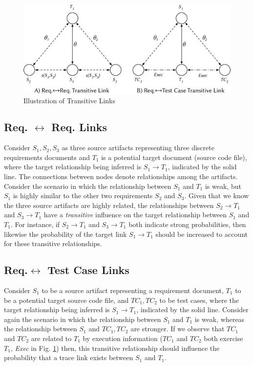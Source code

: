 \begin{figure}%
\centering
\includegraphics[width=\columnwidth]{graphics/applicationsI-approach/fig2_transitive-links.pdf}
\caption{Illustration of Transitive Links}
\label{fig:trans-req2req}
\end{figure}

\subsection{\textbf{Req. $\leftrightarrow$ Req. Links}} Consider $S_1,S_2,S_3$ as three source artifacts representing three discrete requirements documents and $T_1$ is a potential target document (\ie source code file), where the target relationship being inferred is $S_1\rightarrow T_1$, indicated by the solid line. The connections between nodes denote relationships among the artifacts. Consider the scenario in which the relationship between $S_1$ and $T_1$ is weak, but $S_1$ is highly similar to the other two requirements $S_2$ and $S_3$. Given that we know the three source artifacts are highly related, the relationships between $S_2\rightarrow T_1$ and $S_3\rightarrow T_1$ have a \textit{transitive} influence on the target relationship between $S_1$ and $T_1$. For instance, if $S_2\rightarrow T_1$ and $S_3\rightarrow T_1$ both indicate strong probabilities, then likewise the probability of the target link $S_1\rightarrow T_1$ should be increased to account for these transitive relationships.

\subsection{\textbf{Req.$\leftrightarrow$ Test Case Links}} Consider $S_1$ to be a source artifact representing a requirement document, $T_1$ to be a potential target source code file, and $TC_1,TC_2$ to be test cases, where the target relationship being inferred is $S_1\rightarrow T_1$, indicated by the solid line. Consider again the scenario in which the relationship between $S_1$ and $T_1$ is weak, whereas the relationship between $S_1$ and $TC_1,TC_2$ are stronger. If we observe that $TC_1$ and $TC_2$ are related to $T_1$ by execution information (\eg $TC_1$ and $TC_2$ both exercise $T_1$, \textit{Exec} in Fig. \ref{fig:trans-req2req}) then, this transitive relationship should influence the probability that a trace link exists between $S_1$ and $T_1$.

